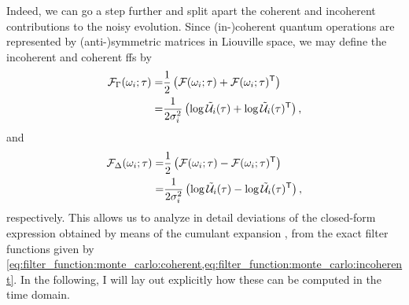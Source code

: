 Indeed, we can go a step further and split apart the coherent and incoherent contributions to the noisy evolution.
Since (in-)coherent quantum operations are represented by (anti-)symmetric matrices in Liouville space, we may define the incoherent and coherent \glspl{ff} by
\begin{equation}
    \label{eq:filter_function:monte_carlo:incoherent}
    \begin{split}
        \mathcal{F}_\Gamma(\omega_i;\tau) =& \frac{1}{2}\left(\mathcal{F}(\omega_i;\tau) + \mathcal{F}(\omega_i;\tau)^\mathsf{T}\right) \\
                                     =& \frac{1}{2\sigma_i^2}\left(\log\mathcal{\tilde{U}}_i(\tau) + \log\mathcal{\tilde{U}}_i(\tau)^\mathsf{T}\right),
    \end{split}
\end{equation}
and
\begin{equation}
    \label{eq:filter_function:monte_carlo:coherent}
    \begin{split}
        \mathcal{F}_\Delta(\omega_i;\tau) =& \frac{1}{2}\left(\mathcal{F}(\omega_i;\tau) - \mathcal{F}(\omega_i;\tau)^\mathsf{T}\right) \\
                                     =& \frac{1}{2\sigma_i^2}\left(\log\mathcal{\tilde{U}}_i(\tau) - \log\mathcal{\tilde{U}}_i(\tau)^\mathsf{T}\right),
    \end{split}
\end{equation}
respectively.
This allows us to analyze in detail deviations of the closed-form expression obtained by means of the cumulant expansion , from the exact filter functions given by \cref{eq:filter_function:monte_carlo:coherent,eq:filter_function:monte_carlo:incoherent}.
In the following, I will lay out explicitly how these can be computed in the time domain.


